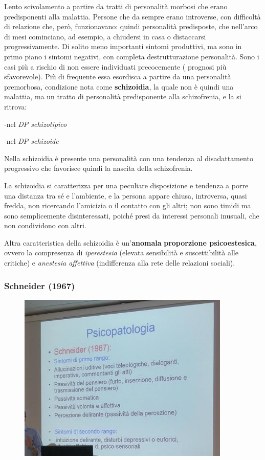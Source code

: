 Lento scivolamento a partire da tratti di personalità morbosi che erano
predisponenti alla malattia. Persone che da sempre erano introverse, con
difficoltà di relazione che, però, funzionavano: quindi personalità
predisposte, che nell'arco di mesi cominciano, ad esempio, a chiudersi
in casa o distaccarsi progressivamente. Di solito meno importanti
sintomi produttivi, ma sono in primo piano i sintomi negativi, con
completa destrutturazione personalità. Sono i casi più a rischio di non
essere individuati precocemente ( prognosi più sfavorevole). Più di
frequente essa esordisca a partire da una personalità premorbosa,
condizione nota come \textbf{schizoidia}, la quale non è quindi una
malattia, ma un tratto di personalità predisponente alla schizofrenia, e
la si ritrova:

-nel \emph{DP schizotipico}

-nel \emph{DP schizoide}

Nella schizoidia è presente una personalità con una tendenza al
disadattamento progressivo che favorisce quindi la nascita della
schizofrenia.

La schizoidia si caratterizza per una peculiare disposizione e tendenza
a porre una distanza tra sé e l'ambiente, e la persona appare chiusa,
introversa, quasi fredda, non ricercando l'amicizia o il contatto con
gli altri; non sono timidi ma sono semplicemente disinteressati, poiché
presi da interessi personali inusuali, che non condividono con altri.

Altra caratteristica della schizoidia è un'\textbf{anomala}
\textbf{proporzione psicoestesica}, ovvero la compresenza di
\emph{iperestesia} (elevata sensibilità e suscettibilità alle critiche)
e \emph{anestesia affettiva} (indifferenza alla rete delle relazioni
sociali).

\subsubsection{Schneider (1967)}

\begin{figure}[!ht]
\centering
	\includegraphics[width=0.9\textwidth]{06/image3.jpeg}
\end{figure}

